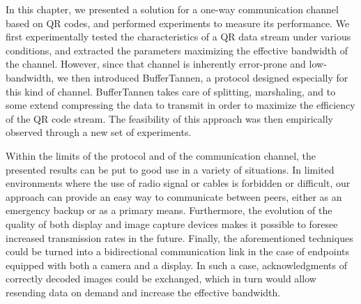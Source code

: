 In this chapter, we presented a solution for a one-way communication channel based on QR codes, and performed experiments to measure its performance. We first experimentally tested the characteristics of a QR data stream under various conditions, and extracted the parameters maximizing the effective bandwidth of the channel. However, since that channel is inherently error-prone and low-bandwidth, we then introduced BufferTannen, a protocol designed especially for this kind of channel. BufferTannen takes care of splitting, marshaling, and to some extend compressing the data to transmit in order to maximize the efficiency of the QR code stream. The feasibility of this approach was then empirically observed through a new set of experiments.

Within the limits of the protocol and of the communication channel, the presented results can be put to good use in a variety of situations. In limited environments where the use of radio signal or cables is forbidden or difficult, our approach can provide an easy way to communicate between peers, either as an emergency backup or as a primary means. Furthermore, the evolution of the quality of both display and image capture devices makes it possible to foresee increased transmission rates in the future. %
Finally, the aforementioned techniques could be turned into a bidirectional communication link in the case of endpoints equipped with both a camera and a display. In such a case, acknowledgments of correctly decoded images could be exchanged, which in turn would allow resending data on demand and increase the effective bandwidth.

